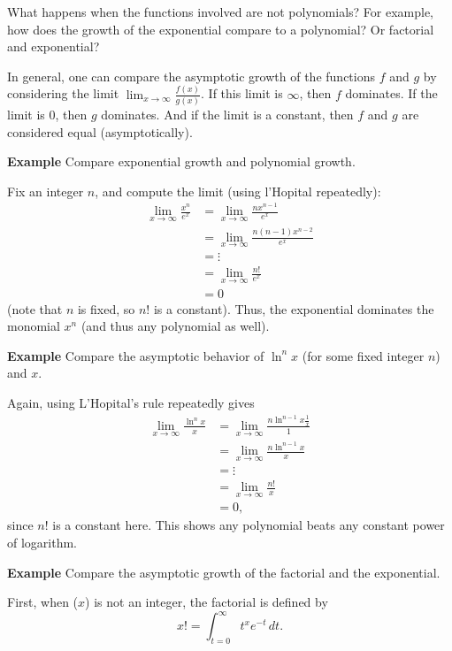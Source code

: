 \documentclass[twoside,openright,titlepage,a4paper]{book}
\begin{document}
\begin{sloppypar}
What happens when the functions involved are not polynomials? For example, how does the growth of the exponential compare to a polynomial? Or factorial and exponential?

In general, one can compare the asymptotic growth of the functions $f$ and $g$ by considering the limit $\lim_{x \rightarrow \infty} \frac{f(x)}{g(x)}$. If this limit is $\infty$, then $f$ dominates. If the limit is 0, then $g$ dominates. And if the limit is a constant, then $f$ and $g$ are considered equal (asymptotically).

\textbf{Example} Compare exponential growth and polynomial growth. 
\begin{examplebox}
Fix an integer $n$, and compute the limit (using l'Hopital repeatedly):
\begin{align*}
\lim_{x \rightarrow \infty} \frac{x^n}{e^x} &= \lim_{x \rightarrow \infty} \frac{nx^{n-1}}{e^x} \\
&= \lim_{x \rightarrow \infty} \frac{n(n-1)x^{n-2}}{e^x} \\
&= \vdots \\
&= \lim_{x \rightarrow \infty} \frac{n!}{e^x} \\
&= 0
\end{align*}
(note that $n$ is fixed, so $n!$ is a constant). Thus, the exponential dominates the monomial $x^n$ (and thus any polynomial as well).
\end{examplebox}

\textbf{Example} Compare the asymptotic behavior of $\ln^n x$ (for some fixed integer $n$) and $x$.
\begin{examplebox}
Again, using L'Hopital's rule repeatedly gives
\begin{align*}
\lim_{x \rightarrow \infty} \frac{\ln^n x}{x} &= \lim_{x \rightarrow \infty} \frac{n \ln^{n-1} x \frac{1}{x}}{1} \\
&= \lim_{x \rightarrow \infty} \frac{n \ln^{n-1} x}{x} \\
&= \vdots \\
&= \lim_{x \rightarrow \infty} \frac{n!}{x} \\
&= 0,
\end{align*}
since $n!$ is a constant here. This shows any polynomial beats any constant power of logarithm.
\end{examplebox}

\textbf{Example} Compare the asymptotic growth of the factorial and the exponential.
\begin{examplebox}
First, when ($x$) is not an integer, the factorial is defined by \[ x! = \int_{t=0}^\infty t^x e^{-t} \, dt. \]


\end{examplebox}
\end{sloppypar}
\end{document}
